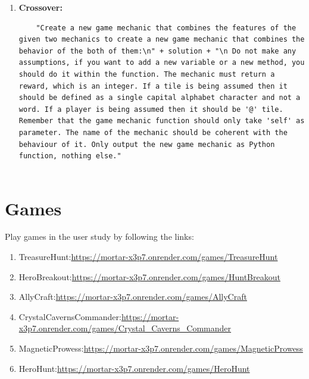 \documentclass{article} %
\begin{document}
\begin{enumerate}
\begin{lstlisting}
\end{lstlisting}

\item \textbf{Crossover:}

\begin{lstlisting}
    "Create a new game mechanic that combines the features of the given two mechanics to create a new game mechanic that combines the behavior of the both of them:\n" + solution + "\n Do not make any assumptions, if you want to add a new variable or a new method, you should do it within the function. The mechanic must return a reward, which is an integer. If a tile is being assumed then it should be defined as a single capital alphabet character and not a word. If a player is being assumed then it should be '@' tile. Remember that the game mechanic function should only take 'self' as parameter. The name of the mechanic should be coherent with the behaviour of it. Only output the new game mechanic as Python function, nothing else."
    
\end{lstlisting}


\end{enumerate}

\section{Games}
\label{appendixD}
Play games in the user study by following the links:

\begin{enumerate}
    \item TreasureHunt:\url{https://mortar-x3p7.onrender.com/games/TreasureHunt}
    \item HeroBreakout:\url{https://mortar-x3p7.onrender.com/games/HuntBreakout}
    \item AllyCraft:\url{https://mortar-x3p7.onrender.com/games/AllyCraft}
    \item CrystalCavernsCommander:\url{https://mortar-x3p7.onrender.com/games/Crystal_Caverns_Commander}
    \item MagneticProwess:\url{https://mortar-x3p7.onrender.com/games/MagneticProwess}
    \item HeroHunt:\url{https://mortar-x3p7.onrender.com/games/HeroHunt}
\end{enumerate}
\end{document}
